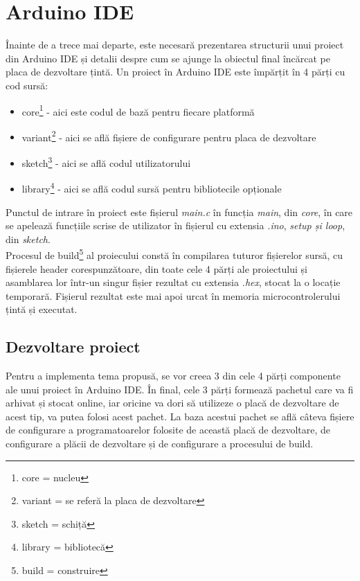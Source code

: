 \documentclass[12pt,a4paper]{report}
\begin{document}
\section{Arduino IDE}
Înainte de a trece mai departe, este necesară prezentarea structurii unui proiect din Arduino IDE și detalii despre cum se ajunge la obiectul final încărcat pe placa de dezvoltare țintă.
Un proiect în Arduino IDE este împărțit în 4 părți cu cod sursă:
\begin{itemize}
	\item{core\footnote{core = nucleu} - aici este codul de bază pentru fiecare platformă}
	\item{variant\footnote{variant = se referă la placa de dezvoltare} - aici se află fișiere de configurare pentru placa de dezvoltare}
	\item{sketch\footnote{sketch = schiță} - aici se află codul utilizatorului}
	\item{library\footnote{library = bibliotecă} - aici se află codul sursă pentru bibliotecile opționale}
\end{itemize}
Punctul de intrare în proiect este fișierul \textit{main.c} în funcția \textit{main}, din \textit{core}, în care se apelează funcțiile scrise de utilizator în fișierul cu extensia \textit{.ino}, \textit{setup și loop}, din \textit{sketch}. \\
Procesul de build\footnote{build = construire} al proiecului constă în compilarea tuturor fișierelor sursă, cu fișierele header corespunzătoare, din toate cele 4 părți ale proiectului și asamblarea lor într-un singur fișier rezultat cu extensia \textit{.hex}, stocat la o locație temporară. Fișierul rezultat este mai apoi urcat în memoria microcontrolerului țintă și executat.

\subsection{Dezvoltare proiect}
Pentru a implementa tema propusă, se vor creea 3 din cele 4 părți componente ale unui proiect în Arduino IDE. În final, cele 3 părți formează pachetul care va fi arhivat și stocat online, iar oricine va dori să utilizeze o placă de dezvoltare de acest tip, va putea folosi acest pachet. La baza acestui pachet se află câteva fișiere de configurare a programatoarelor folosite de această placă de dezvoltare, de configurare a plăcii de dezvoltare și de configurare a procesului de build.
\end{document}

